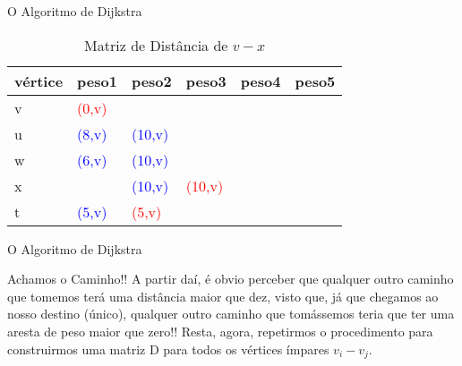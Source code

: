 \documentclass[xcolor=table]{beamer}
\begin{document}
\begin{frame}{O Algoritmo de Dijkstra}

\begin{center}
\end{center}

\noindent \begin{table}[]
\centering
\caption{Matriz de Distância de $v-x$}
\label{my-label}
\begin{tabular}{|l|l|l|l|l|l|}
\hline
vértice & peso1                   & peso2                       & peso3                    & peso4 & peso5\\ \hline
v       & \textcolor{red}{(0,v)}  &                             &                          &  &     \\ \hline
u       & \textcolor{blue}{(8,v)} & \textcolor{blue}{(10,v)}    &                          &   &    \\ \hline
w       & \textcolor{blue}{(6,v)} & \textcolor{blue}{(10,v)}    &                          &    &   \\ \hline
x       &                         & \textcolor{blue}{(10,v)}    & \textcolor{red}{(10,v)}  &     &  \\ \hline
t       &\textcolor{blue}{(5,v)}  &  \textcolor{red}{(5,v)}     &                          &      & \\ \hline
\end{tabular}
\end{table}
\end{frame}

\begin{frame}{O Algoritmo de Dijkstra}
    \begin{alertblock}{Achamos o Caminho!!}
        A partir daí, é obvio perceber que qualquer outro caminho que tomemos terá uma distância maior que dez, visto que, já que chegamos ao nosso destino (único), qualquer outro caminho que tomássemos teria que ter uma aresta de peso maior que zero!! Resta, agora, repetirmos o procedimento para construirmos uma matriz D para todos os vértices ímpares $v_{i}-v_{j}$. 
    \end{alertblock}
    
\end{frame}
\end{document}
